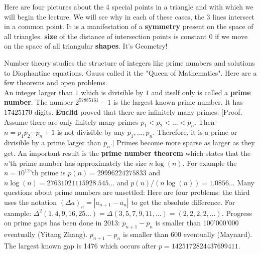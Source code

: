 \documentclass[12pt]{amsart}
\def\chapter#1{ \vspace{2mm} \begin{center} \fcolorbox{green1}{green1}{ \parbox{16.2cm}{{\Large {\bf #1}}}} \vspace{2mm} \end{center} }
\newcounter{example}    \def\example#1{ \item \fontsize{12}{15} \selectfont #1 \fontsize{12}{15} \selectfont }
\begin{document}
Here are four pictures about the 4 special points in a triangle and
with which we will begin the lecture. 
We will see why in each of these cases, the 3 lines intersect in a common point.
It is a manifestation of a {\bf symmetry} present on the space of all 
triangles. {\bf size} of the distance of intersection points is constant 
$0$ if we move on the space of all triangular {\bf shapes}. It's Geometry! \\

 \pagebreak
{}

\chapter{Lecture 4: Number Theory}

Number theory studies the structure of integers like prime numbers and 
solutions to Diophantine equations. 
Gauss called it the "Queen of Mathematics". Here are a few theorems and open problems. \\
An integer larger than $1$ which is divisible by $1$ and itself only is called a {\bf prime number}.
The number $2^{57885161}-1$ is the largest known prime number. It has $17425170$ digits.
{\bf Euclid} proved that there are infinitely many primes: 
[Proof. Assume there are only finitely many primes $p_1<p_2< \dots < p_n$. Then $n=p_1 p_2 \cdots p_n + 1$
is not divisible by any $p_1, \dots,p_n$. Therefore, it is a prime or divisible by a 
prime larger than $p_n$.] Primes become more sparse as larger as they get. An important result is
the {\bf prime number theorem} which states that the $n$'th prime number has approximately
the size $n \log(n)$. For example the $n=10^{12}$'th prime is $p(n) = 29996224275833$ and 
$n \log(n) = 27631021115928.545...$ and $p(n)/(n \log(n)) = 1.0856..$.
Many questions about prime numbers are unsettled:
Here are four problems: the third uses the notation $(\Delta a)_n = |a_{n+1}-a_n|$ to get
the absolute difference. For example: $\Delta^2 (1,4,9,16,25 ...) =
\Delta(3,5,7,9,11,...) = (2,2,2,2,...)$. Progress on prime gaps has been done in 2013:
$p_{n+1}-p_n$ is smaller than 100'000'000 eventually (Yitang Zhang).
$p_{n+1}-p_n$ is smaller than $600$ eventually (Maynard). 
The largest known gap is 1476 which occurs after $p=1425172824437699411$. 
\end{document}
